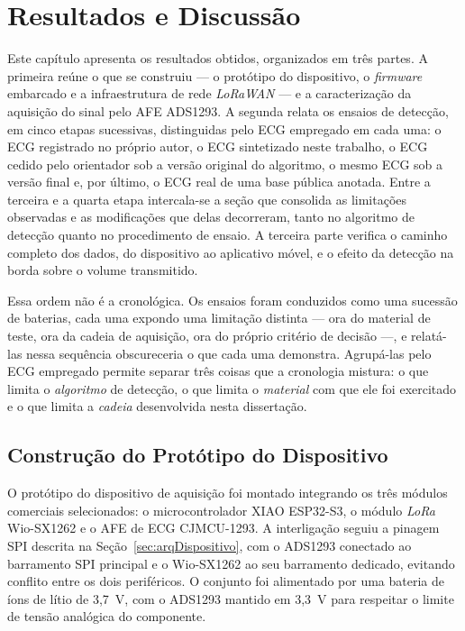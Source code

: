 \chapter{Resultados e Discussão}
\label{chap:resultados}

Este capítulo apresenta os resultados obtidos, organizados em três partes. A primeira
reúne o que se construiu --- o protótipo do dispositivo, o \textit{firmware} embarcado e a
infraestrutura de rede \textit{LoRaWAN} --- e a caracterização da aquisição do sinal pelo
\acs{AFE} ADS1293. A segunda relata os ensaios de detecção, em cinco etapas sucessivas,
distinguidas pelo \acs{ECG} empregado em cada uma: o \acs{ECG} registrado no próprio
autor, o \acs{ECG} sintetizado neste trabalho, o \acs{ECG} cedido pelo orientador sob a
versão original do algoritmo, o mesmo \acs{ECG} sob a versão final e, por último, o
\acs{ECG} real de uma base pública anotada. Entre a terceira e a quarta etapa intercala-se
a seção que consolida as limitações observadas e as modificações que delas decorreram,
tanto no algoritmo de detecção quanto no procedimento de ensaio. A terceira parte verifica
o caminho completo dos dados, do dispositivo ao aplicativo móvel, e o efeito da detecção na
borda sobre o volume transmitido.

Essa ordem não é a cronológica. Os ensaios foram conduzidos como uma sucessão de baterias,
cada uma expondo uma limitação distinta --- ora do material de teste, ora da cadeia de
aquisição, ora do próprio critério de decisão ---, e relatá-las nessa sequência obscureceria
o que cada uma demonstra. Agrupá-las pelo \acs{ECG} empregado permite separar três coisas
que a cronologia mistura: o que limita o \emph{algoritmo} de detecção, o que limita o
\emph{material} com que ele foi exercitado e o que limita a \emph{cadeia} desenvolvida
nesta dissertação.

\section{Construção do Protótipo do Dispositivo}
\label{sec:resProtótipo}

O protótipo do dispositivo de aquisição foi montado integrando os três módulos comerciais selecionados: o microcontrolador XIAO ESP32-S3, o módulo \textit{LoRa} Wio-SX1262 e o \acs{AFE} de \acs{ECG} CJMCU-1293. A interligação seguiu a pinagem \acs{SPI} descrita na Seção~\ref{sec:arqDispositivo}, com o ADS1293 conectado ao barramento \acs{SPI} principal e o Wio-SX1262 ao seu barramento dedicado, evitando conflito entre os dois periféricos. O conjunto foi alimentado por uma bateria de íons de lítio de 3,7~V, com o ADS1293 mantido em 3,3~V para respeitar o limite de tensão analógica do componente.

